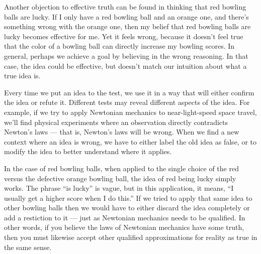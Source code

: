 \documentclass[11pt, oneside]{article}   	%
\newtheorem{obs}{Observation}
\begin{document}
Another objection to effective truth can be found in thinking that red bowling
balls are lucky.
If I only have a red bowling ball and an orange one,
and there's
something wrong with the orange one, then my belief that red bowling balls are
lucky becomes effective for me. Yet it feels wrong, because it doesn't feel true
that the color of a bowling ball can directly increase my bowling scores.
In general, perhaps we achieve a goal by believing in the wrong reasoning.
In that case, the idea could be effective, but doesn't match our intuition about
what a true idea is.

Every time we put an idea to the test, we use it in a way that will either
confirm the idea or refute it. Different tests may reveal different aspects of
the idea. For example, if we try to apply Newtonian mechanics to
near-light-speed space travel, we'll find physical experiments where an
observation directly contradicts Newton's laws --- that is, Newton's laws will
be wrong.
When we find a new context where an idea is wrong, we have to either
label the old idea as false, or to modify the idea to
better understand where it applies.

In the case of red bowling balls, when applied to the single choice of the red
versus the defective orange bowling ball, the idea of red being lucky simply
works. The phrase ``is lucky'' is vague, but in this application, it
means, ``I usually get a higher score when I do this.''
If we tried to apply that same idea to other bowling balls then we would have to
either discard the idea completely or add a restiction to it --- just as
Newtonian mechanics needs to be qualified.
In other words, if you believe
the laws of Newtonian mechanics have some truth, then you must likewise accept
other qualified approximations for reality as true in the same sense.

\end{document}
